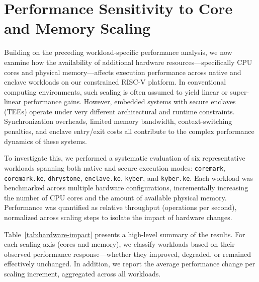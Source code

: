 \section{Performance Sensitivity to Core and Memory Scaling}
\label{sec:hardware-impact}

Building on the preceding workload-specific performance analysis, we now examine how the availability of additional hardware resources—specifically CPU cores and physical memory—affects execution performance across native and enclave workloads on our constrained RISC-V platform. In conventional computing environments, such scaling is often assumed to yield linear or super-linear performance gains. However, embedded systems with secure enclaves (TEEs) operate under very different architectural and runtime constraints. Synchronization overheads, limited memory bandwidth, context-switching penalties, and enclave entry/exit costs all contribute to the complex performance dynamics of these systems.

To investigate this, we performed a systematic evaluation of six representative workloads spanning both native and secure execution modes: \texttt{coremark}, \texttt{coremark.ke}, \texttt{dhrystone}, \texttt{enclave.ke}, \texttt{kyber}, and \texttt{kyber.ke}. Each workload was benchmarked across multiple hardware configurations, incrementally increasing the number of CPU cores and the amount of available physical memory. Performance was quantified as relative throughput (operations per second), normalized across scaling steps to isolate the impact of hardware changes.

Table~\ref{tab:hardware-impact} presents a high-level summary of the results. For each scaling axis (cores and memory), we classify workloads based on their observed performance response—whether they improved, degraded, or remained effectively unchanged. In addition, we report the average performance change per scaling increment, aggregated across all workloads.

